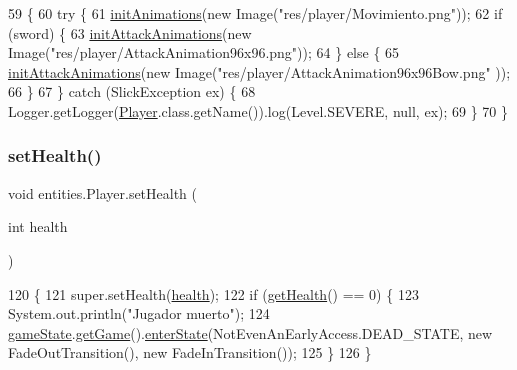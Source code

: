 \begin{DoxyCode}
59                                                      \{
60         \textcolor{keywordflow}{try} \{
61             \mbox{\hyperlink{classentities_1_1_subject_a8f7fce95025c0e91f513879c1f8bbc87}{initAnimations}}(\textcolor{keyword}{new} Image(\textcolor{stringliteral}{"res/player/Movimiento.png"}));
62             \textcolor{keywordflow}{if} (sword) \{
63                 \mbox{\hyperlink{classentities_1_1_subject_ae45c2e60e4a06553e53cffdde41106b6}{initAttackAnimations}}(\textcolor{keyword}{new} Image(\textcolor{stringliteral}{"res/player/AttackAnimation96x96.png"}));
64             \} \textcolor{keywordflow}{else} \{
65                 \mbox{\hyperlink{classentities_1_1_subject_ae45c2e60e4a06553e53cffdde41106b6}{initAttackAnimations}}(\textcolor{keyword}{new} Image(\textcolor{stringliteral}{"res/player/AttackAnimation96x96Bow.png"}
      ));
66             \}
67         \} \textcolor{keywordflow}{catch} (SlickException ex) \{
68             Logger.getLogger(\mbox{\hyperlink{class_player}{Player}}.class.getName()).log(Level.SEVERE, null, ex);
69         \}
70     \}
\end{DoxyCode}
\mbox{\label{classentities_1_1_player_a3d96b84a313d4ab5278223c2e0a7df35}} 
\subsubsection{\texorpdfstring{set\+Health()}{setHealth()}}
{\footnotesize\ttfamily void entities.\+Player.\+set\+Health (\begin{DoxyParamCaption}\item[{int}]{health }\end{DoxyParamCaption})\hspace{0.3cm}{\ttfamily [inline]}}


\begin{DoxyCode}
120                                       \{
121         super.setHealth(\mbox{\hyperlink{classentities_1_1_subject_a8285660fdae3f0b220bbc686cf5c012c}{health}});
122         \textcolor{keywordflow}{if} (\mbox{\hyperlink{classentities_1_1_subject_a5876631b4eb906fe9e1b51dd94a849e4}{getHealth}}() == 0) \{
123             System.out.println(\textcolor{stringliteral}{"Jugador muerto"});
124             \mbox{\hyperlink{classentities_1_1_player_a5c0c41f4ba8b9647580089c5314cd3a6}{gameState}}.\mbox{\hyperlink{classstates_1_1_game_state_a08a716dc1292aef4744b305312e598f1}{getGame}}().\mbox{\hyperlink{classorg_1_1newdawn_1_1slick_1_1state_1_1_state_based_game_a30b279d5177837e9d4eee745c79cc069}{enterState}}(NotEvenAnEarlyAccess.DEAD\_STATE, \textcolor{keyword}{new} 
      FadeOutTransition(), \textcolor{keyword}{new} FadeInTransition());
125         \}
126     \}
\end{DoxyCode}
\mbox{\label{classentities_1_1_player_a052aaf6746c2281916b121f3db9f5958}} 
